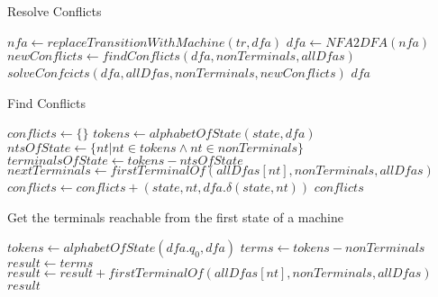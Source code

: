 \begin{algorithm}
	\caption{Resolve Conflicts}	\label{alg:conflicts}
	\begin{algorithmic}[1]
			\State $nfa \gets replaceTransitionWithMachine(tr, dfa)$
		\EndFor
		\State $dfa \gets NFA2DFA(nfa)$
		\State $newConflicts \gets findConflicts(dfa, nonTerminals, allDfas)$
			\State \Return $solveConfcicts(dfa, allDfas, nonTerminals, newConflicts)$
		\Else	
			\State \Return $dfa$
		\EndIf
		\EndFunction
	\end{algorithmic}
\end{algorithm}
\vfill
\begin{algorithm}
	\caption{Find Conflicts}
	\begin{algorithmic}[1]		
			\State $conflicts \gets \{\}$
				\State $tokens \gets alphabetOfState(state, dfa)$
				\State $ntsOfState \gets \{nt | nt \in tokens \land nt \in nonTerminals\}$
				\State $terminalsOfState \gets tokens - ntsOfState$
					\State $nextTerminals \gets firstTerminalOf(allDfas[nt], nonTerminals, allDfas)$
						\State $conflicts \gets conflicts + (state, nt, dfa.\delta(state, nt))$ 
					\EndIf
				\EndFor
			\EndFor
		\State \Return $conflicts$
		\EndFunction		
	\end{algorithmic}
\end{algorithm}
\vfill
\begin{algorithm}
	\caption{Get the terminals reachable from the first state of a machine}
	\begin{algorithmic}[1]		
			\State $tokens \gets alphabetOfState(dfa.q_0, dfa)$
			\State $terms \gets tokens - nonTerminals$
			\State $result \gets terms$
				\State $result \gets result + firstTerminalOf(allDfas[nt], nonTerminals, allDfas)$
			\EndFor		
			\State \Return $result$
		\EndFunction
	\end{algorithmic}
\end{algorithm}